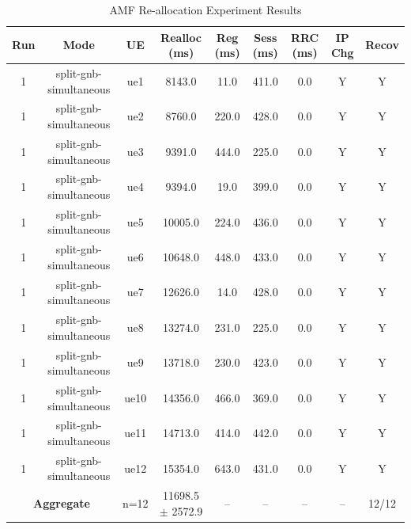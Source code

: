 \begin{table}[ht]
\centering
\begin{tabular}{|c|c|c|c|c|c|c|c|c|}
\hline
Run & Mode & UE & Realloc (ms) & Reg (ms) & Sess (ms) & RRC (ms) & IP Chg & Recov \\
\hline
1 & split-gnb-simultaneous & ue1 & 8143.0 & 11.0 & 411.0 & 0.0 & Y & Y \\
1 & split-gnb-simultaneous & ue2 & 8760.0 & 220.0 & 428.0 & 0.0 & Y & Y \\
1 & split-gnb-simultaneous & ue3 & 9391.0 & 444.0 & 225.0 & 0.0 & Y & Y \\
1 & split-gnb-simultaneous & ue4 & 9394.0 & 19.0 & 399.0 & 0.0 & Y & Y \\
1 & split-gnb-simultaneous & ue5 & 10005.0 & 224.0 & 436.0 & 0.0 & Y & Y \\
1 & split-gnb-simultaneous & ue6 & 10648.0 & 448.0 & 433.0 & 0.0 & Y & Y \\
1 & split-gnb-simultaneous & ue7 & 12626.0 & 14.0 & 428.0 & 0.0 & Y & Y \\
1 & split-gnb-simultaneous & ue8 & 13274.0 & 231.0 & 225.0 & 0.0 & Y & Y \\
1 & split-gnb-simultaneous & ue9 & 13718.0 & 230.0 & 423.0 & 0.0 & Y & Y \\
1 & split-gnb-simultaneous & ue10 & 14356.0 & 466.0 & 369.0 & 0.0 & Y & Y \\
1 & split-gnb-simultaneous & ue11 & 14713.0 & 414.0 & 442.0 & 0.0 & Y & Y \\
1 & split-gnb-simultaneous & ue12 & 15354.0 & 643.0 & 431.0 & 0.0 & Y & Y \\
\multicolumn{2}{|c|}{\textbf{Aggregate}} & n=12 & 11698.5 $\pm$ 2572.9 & -- & -- & -- & -- & 12/12 \\
\hline
\end{tabular}
\caption{AMF Re-allocation Experiment Results}
\label{tab:amf_realloc}
\end{table}
